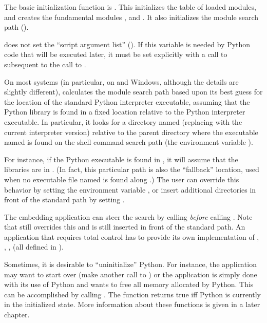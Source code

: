 \documentclass[twoside,openright]{report}
\begin{document}
The basic initialization function is .  This 
initializes the table of loaded modules, and creates the fundamental 
modules ,  and .  It also 
initializes the module search path ().

 does not set the ``script argument list'' 
().  If this variable is needed by Python code that 
will be executed later, it must be set explicitly with a call to 
 subsequent to the call 
to .

On most systems (in particular, on \UNIX{} and Windows, although the
details are slightly different),  calculates the
module search path based upon its best guess for the location of the
standard Python interpreter executable, assuming that the Python
library is found in a fixed location relative to the Python
interpreter executable.  In particular, it looks for a directory named
 (replacing  with the current
interpreter version) relative to the parent directory where the
executable named  is found on the shell command search
path (the environment variable ).

For instance, if the Python executable is found in
, it will assume that the libraries are in
.  (In fact, this particular path is
also the ``fallback'' location, used when no executable file named
 is found along .)  The user can override
this behavior by setting the environment variable ,
or insert additional directories in front of the standard path by
setting .

The embedding application can steer the search by calling 
 \emph{before} calling 
.  Note that  still overrides 
this and  is still inserted in front of the 
standard path.  An application that requires total control has to
provide its own implementation of ,
, ,
 (all defined in
).

Sometimes, it is desirable to ``uninitialize'' Python.  For instance, 
the application may want to start over (make another call to 
) or the application is simply done with its 
use of Python and wants to free all memory allocated by Python.  This
can be accomplished by calling .  The function
 returns true iff Python is currently in the
initialized state.  More information about these functions is given in
a later chapter.
\end{document}
